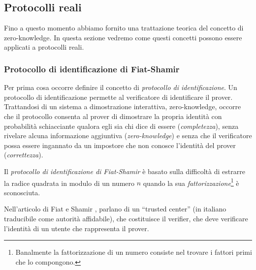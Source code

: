 \documentclass{article}
\theoremstyle{definition}
\begin{document}
\subsection{Protocolli reali}
Fino a questo momento abbiamo fornito una trattazione teorica del concetto di zero-knowledge. In questa sezione vedremo come questi concetti possono essere applicati a protocolli reali.

\subsubsection{Protocollo di identificazione di Fiat-Shamir}
Per prima cosa occorre definire il concetto di \emph{protocollo di identificazione}. Un protocollo di identificazione permette al verificatore di identificare il prover. 
Trattandosi di un sistema a dimostrazione interattiva, zero-knowledge, occorre che il protocollo consenta al prover di dimostrare la propria identità con probabilità schiacciante qualora egli sia chi dice di essere (\emph{completezza}), senza rivelare alcuna informazione aggiuntiva (\emph{zero-knowledge}) e senza che il verificatore possa essere ingannato da un impostore che non conosce l'identità del prover (\emph{correttezza}).

Il \emph{protocollo di identificazione di Fiat-Shamir} è basato sulla difficoltà di estrarre la radice quadrata in modulo di un numero $n$ quando la sua \emph{fattorizzazione}\footnote{Banalmente la fattorizzazione di un numero consiste nel trovare i fattori primi che lo compongono.} è sconosciuta.

Nell'articolo di Fiat e Shamir \cite{identification}, parlano di un ``trusted center'' (in italiano traducibile come autorità affidabile), che costituisce il verifier, che deve verificare l'identità di un utente che rappresenta il prover.
\end{document}
